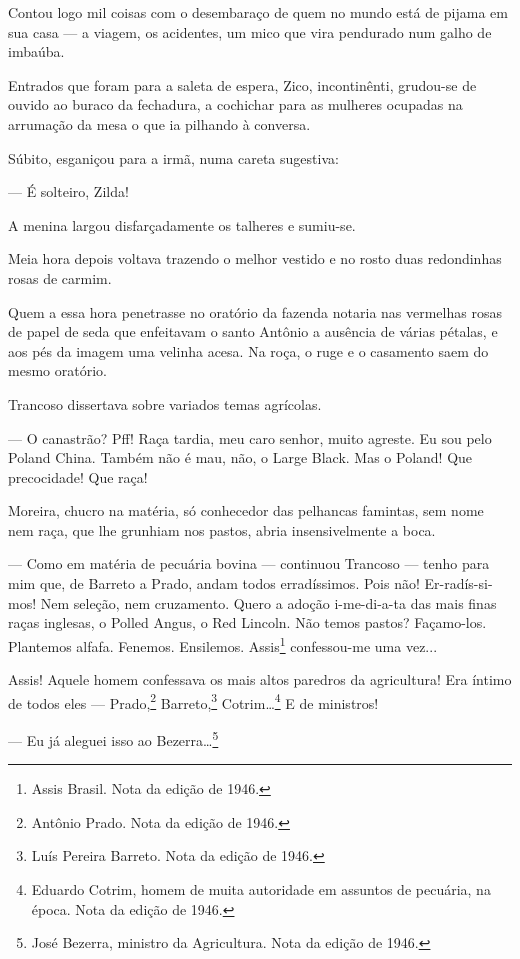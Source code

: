 Contou logo mil coisas com o desembaraço de quem no mundo está de pijama
em sua casa --- a viagem, os acidentes, um mico que vira pendurado num
galho de imbaúba.

Entrados que foram para a saleta de espera, Zico, incontinênti,
grudou-se de ouvido ao buraco da fechadura, a cochichar para as mulheres
ocupadas na arrumação da mesa o que ia pilhando à conversa.

Súbito, esganiçou para a irmã, numa careta sugestiva:

--- É solteiro, Zilda!

A menina largou disfarçadamente os talheres e sumiu-se.

Meia hora depois voltava trazendo o melhor vestido e no rosto duas
redondinhas rosas de carmim.

Quem a essa hora penetrasse no oratório da fazenda notaria nas vermelhas
rosas de papel de seda que enfeitavam o santo Antônio a ausência de
várias pétalas, e aos pés da imagem uma velinha acesa. Na roça, o ruge e
o casamento saem do mesmo oratório.

Trancoso dissertava sobre variados temas agrícolas.

--- O canastrão? Pff! Raça tardia, meu caro senhor, muito agreste. Eu
sou pelo Poland China. Também não é mau, não, o Large Black. Mas o
Poland! Que precocidade! Que raça!

Moreira, chucro na matéria, só conhecedor das pelhancas famintas, sem
nome nem raça, que lhe grunhiam nos pastos, abria insensivelmente a
boca.

--- Como em matéria de pecuária bovina --- continuou Trancoso --- tenho
para mim que, de Barreto a Prado, andam todos erradíssimos. Pois não!
Er-radís-si-mos! Nem seleção, nem cruzamento. Quero a adoção
i-me-di-a-ta das mais finas raças inglesas, o Polled Angus, o Red
Lincoln. Não temos pastos? Façamo-los. Plantemos alfafa. Fenemos.
Ensilemos. Assis\footnote{Assis Brasil. Nota da edição de 1946.}
confessou-me uma vez...

Assis! Aquele homem confessava os mais altos paredros da agricultura!
Era íntimo de todos eles --- Prado,\footnote{Antônio Prado. Nota da
  edição de 1946.} Barreto,\footnote{Luís Pereira Barreto. Nota da
  edição de 1946.} Cotrim\ldots{}\footnote{Eduardo Cotrim, homem de
  muita autoridade em assuntos de pecuária, na época. Nota da edição de
  1946.} E de ministros!

--- Eu já aleguei isso ao Bezerra\ldots{}\footnote{José Bezerra,
  ministro da Agricultura. Nota da edição de 1946.}

